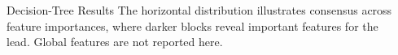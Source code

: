 \documentclass[final]{beamer}
\newlength{\sepwidth}
\newlength{\colwidth}
\newcommand{\separatorcolumn}{\begin{column}{\sepwidth}\end{column}}
\begin{document}
\begin{frame}[t]
\begin{columns}[t]
\begin{column}{\colwidth}
\begin{block}{Decision-Tree Results}
    The horizontal distribution illustrates consensus across feature importances, where darker blocks reveal important features for the lead. Global features are not reported here.
  \end{block}

\end{column}

\separatorcolumn
\end{columns}
\end{frame}
\end{document}
